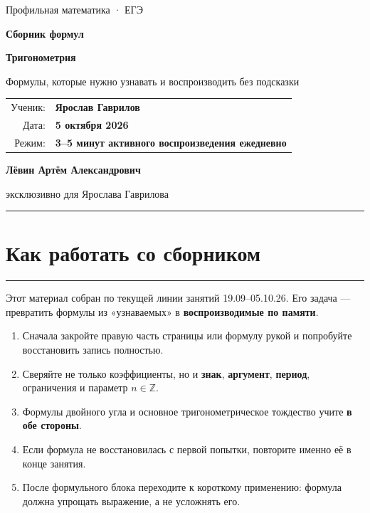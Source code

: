 \documentclass[a4paper,12pt]{article}
\newcommand{\sectionline}{\vspace{-1mm}\noindent\color{accent}\rule{\linewidth}{0.7pt}\color{textgray}\vspace{2mm}}
\newcommand{\key}[1]{\textbf{\color{darkaccent}#1}}
\newcommand{\Z}{\mathbb{Z}}
\begin{document}
\color{textgray}

\thispagestyle{empty}
\begin{center}
\vspace*{20mm}
{\Large\color{softgray}Профильная математика · ЕГЭ\par}
\vspace{8mm}
{\fontsize{29}{34}\selectfont\bfseries\color{darkaccent}Сборник формул\par}
\vspace{4mm}
{\fontsize{21}{25}\selectfont\bfseries Тригонометрия\par}
\vspace{3mm}
{\large Формулы, которые нужно узнавать и воспроизводить без подсказки\par}

\vspace{18mm}
\begin{tabular}{@{}rl@{}}
\color{softgray}Ученик: & \textbf{Ярослав Гаврилов}\\[2mm]
\color{softgray}Дата: & \textbf{5 октября 2026}\\[2mm]
\color{softgray}Режим: & \textbf{3--5 минут активного воспроизведения ежедневно}
\end{tabular}

\vfill
{\large\bfseries\color{darkaccent}Лёвин Артём Александрович\par}
\vspace{1mm}
{\normalsize эксклюзивно для Ярослава Гаврилова\par}
\vspace{14mm}
{\color{accent}\rule{0.72\linewidth}{1.2pt}}
\end{center}
\clearpage

\section*{Как работать со сборником}
\sectionline

Этот материал собран по текущей линии занятий 19.09--05.10.26. Его задача --- превратить формулы из «узнаваемых» в \key{воспроизводимые по памяти}.

\begin{enumerate}
  \item Сначала закройте правую часть страницы или формулу рукой и попробуйте восстановить запись полностью.
  \item Сверяйте не только коэффициенты, но и \key{знак}, \key{аргумент}, \key{период}, ограничения и параметр $n\in\Z$.
  \item Формулы двойного угла и основное тригонометрическое тождество учите \key{в обе стороны}.
  \item Если формула не восстановилась с первой попытки, повторите именно её в конце занятия.
  \item После формульного блока переходите к короткому применению: формула должна упрощать выражение, а не усложнять его.
\end{enumerate}
\end{document}
